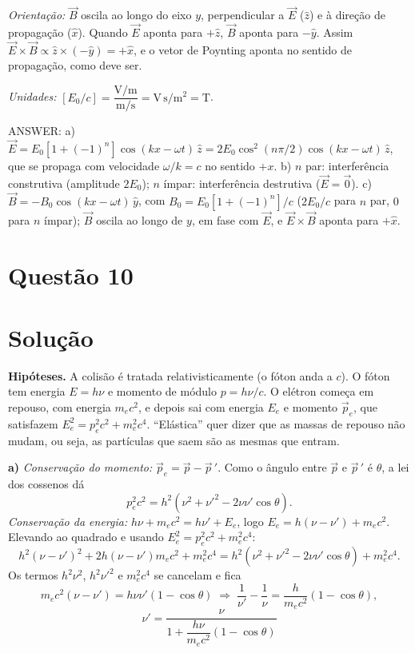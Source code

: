 \documentclass{article}%
\begin{document}
\emph{Orientação:} $\vec B$ oscila ao longo do eixo $y$, perpendicular a $\vec E$ ($\hat z$) e à direção de propagação ($\hat x$). Quando $\vec E$ aponta para $+\hat z$, $\vec B$ aponta para $-\hat y$. Assim $\vec E\times\vec B\propto\hat z\times(-\hat y)=+\hat x$, e o vetor de Poynting aponta no sentido de propagação, como deve ser.

\emph{Unidades:} $[E_0/c]=\dfrac{\mathrm{V/m}}{\mathrm{m/s}}=\mathrm{V\,s/m^2}=\mathrm{T}$.

ANSWER: a) $\vec E=E_0[1+(-1)^n]\cos(kx-\omega t)\,\hat z=2E_0\cos^2(n\pi/2)\cos(kx-\omega t)\,\hat z$, que se propaga com velocidade $\omega/k=c$ no sentido $+x$. b) $n$ par: interferência construtiva (amplitude $2E_0$); $n$ ímpar: interferência destrutiva ($\vec E=\vec 0$). c) $\vec B=-B_0\cos(kx-\omega t)\,\hat y$, com $B_0=E_0[1+(-1)^n]/c$ ($2E_0/c$ para $n$ par, $0$ para $n$ ímpar); $\vec B$ oscila ao longo de $y$, em fase com $\vec E$, e $\vec E\times\vec B$ aponta para $+\hat x$.%
\newpage%
\section*{Questão 10}

\section*{Solução}

\textbf{Hipóteses.} A colisão é tratada relativisticamente (o fóton anda a $c$). O fóton tem energia $E=h\nu$ e momento de módulo $p=h\nu/c$. O elétron começa em repouso, com energia $m_ec^2$, e depois sai com energia $E_e$ e momento $\vec p_e$, que satisfazem $E_e^2=p_e^2c^2+m_e^2c^4$. ``Elástica'' quer dizer que as massas de repouso não mudam, ou seja, as partículas que saem são as mesmas que entram.

\medskip
\textbf{a)} \emph{Conservação do momento:} $\vec p_e=\vec p-\vec p\,'$. Como o ângulo entre $\vec p$ e $\vec p\,'$ é $\theta$, a lei dos cossenos dá
\[
p_e^2c^2=h^2\left(\nu^2+\nu'^2-2\nu\nu'\cos\theta\right).
\]
\emph{Conservação da energia:} $h\nu+m_ec^2=h\nu'+E_e$, logo $E_e=h(\nu-\nu')+m_ec^2$. Elevando ao quadrado e usando $E_e^2=p_e^2c^2+m_e^2c^4$:
\[
h^2(\nu-\nu')^2+2h(\nu-\nu')m_ec^2+m_e^2c^4=h^2\left(\nu^2+\nu'^2-2\nu\nu'\cos\theta\right)+m_e^2c^4 .
\]
Os termos $h^2\nu^2$, $h^2\nu'^2$ e $m_e^2c^4$ se cancelam e fica
\[
m_ec^2(\nu-\nu')=h\nu\nu'(1-\cos\theta)\;\Longrightarrow\;\frac{1}{\nu'}-\frac{1}{\nu}=\frac{h}{m_ec^2}(1-\cos\theta),
\]
\[
\boxed{\nu'=\dfrac{\nu}{1+\dfrac{h\nu}{m_ec^2}(1-\cos\theta)}}
\]
\end{document}
